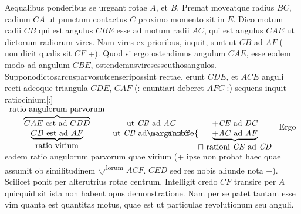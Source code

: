 \pend
\vspace{1em}%
\pstart 
\noindent
{}
Aequalibus ponderibus se urgeant rotae $A$, et $B$.
Premat moveatque radius $BC$, radium $CA$ ut punctum contactus $C$ proximo momento sit in $E$.
Dico motum radii $CB$ qui est angulus $CBE$ esse ad motum radii $AC$, qui est angulus $CAE$ ut dictorum radiorum vires. Nam vires ex prioribus, inquit, sunt ut $CB$ ad $AF$ (+ non dicit qualis sit $CF$ +). Quod si ergo ostendimus angulum $CAE$, esse eodem modo ad angulum $CBE$, ostendemus\hfill vires\hfill esse\hfill ut\hfill hos\hfill angulos.\hfill
Suppono\hfill dictos\hfill arcus\hfill {}\hfill parvos\hfill ut\hfill censeri\hfill possint 
\pend
\newpage
\pstart
\noindent rectae, erunt $CDE$, et $ACE$ anguli recti adeoque triangula $CDE$, $CAF$ (: enuntiari deberet $AFC$ :)  sequens inquit ratiocinium[:]
\pend
\vspace{0.5em}%
\pstart
\noindent%
$\begin{array}{ccl}
\overbrace{CAE\text{ est ad } CBD}^{\displaystyle\text{ratio angulorum parvorum}}&\text{ut \textit{CB} ad \textit{AC}}&\hspace*{6mm}+\text{\textit{CE} ad \textit{DC}} \\
\underbrace{CB\text{ est ad }AF}_{\displaystyle\text{ratio virium}}&\text{ut \textit{CB} {ad\reversemarginpar\marginnote{\scriptsize\hspace{-13mm}5}} \textit{AC}}&\underbrace{+\text{\textit{AC} ad \textit{AF}}}_{\displaystyle \sqcap\ \text{rationi \textit{CE} ad \textit{CD}}}\\
\end{array}$
\pend
\vspace*{0.5em}%
\pstart%
\noindent%
Ergo eadem ratio angulorum parvorum quae virium (+ ipse non probat haec quae assumit ob similitudinem $\bigtriangledown$\textsuperscript{lorum} $ACF$. $CED$ sed res nobis aliunde nota +). Scilicet ponit  per alterutrius rotae centrum. Intelligit credo $CF$ transire per $A$ quicquid sit ista non habent opus demonstratione. Nam per se patet tantam esse vim quanta est quantitas motus, quae est ut particulae revolutionum seu anguli.
